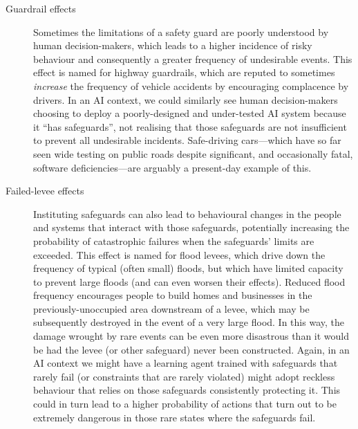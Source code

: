 \documentclass[11pt]{article}
\begin{document}
\begin{description}
  \item[Guardrail effects]
    Sometimes the limitations of a safety guard are poorly understood by human
    decision-makers, which leads to a higher incidence of risky behaviour and
    consequently a greater frequency of undesirable events.
    This effect is named for highway guardrails, which are reputed to sometimes
    \textit{increase} the frequency of vehicle accidents by encouraging
    complacence by drivers.
    In an AI context, we could similarly see human decision-makers choosing to
    deploy a poorly-designed and under-tested AI system because it ``has
    safeguards'', not realising that those safeguards are not insufficient to
    prevent all undesirable incidents.
    Safe-driving cars---which have so far seen wide testing on public roads
    despite significant, and occasionally fatal, software deficiencies---are
    arguably a present-day example of this.


  \item[Failed-levee effects]
    Instituting safeguards can also lead to behavioural changes in the people
    and systems that interact with those safeguards, potentially increasing the
    probability of catastrophic failures when the safeguards' limits are exceeded.
    This effect is named for flood levees, which drive down the frequency of
    typical (often small) floods, but which have limited capacity to prevent
    large floods (and can even worsen their effects).
    Reduced flood frequency encourages people to build homes and businesses in
    the previously-unoccupied area downstream of a levee, which may be
    subsequently destroyed in the event of a very large flood.
    In this way, the damage wrought by rare events can be even more disastrous
    than it would be had the levee (or other safeguard) never been constructed.
    Again, in an AI context we might have a learning agent trained with
    safeguards that rarely fail (or constraints that are rarely violated) might
    adopt reckless behaviour that relies on those safeguards consistently
    protecting it.
    This could in turn lead to a higher probability of actions that turn out to
    be extremely dangerous in those rare states where the safeguards fail.


\end{description}
\end{document}
